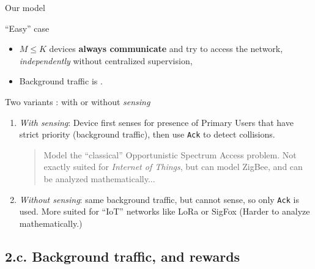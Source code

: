 \documentclass[12pt,english,ignorenonframetext,aspectratio=169,]{beamer}
\providecommand{\tightlist}{%
  \setlength{\itemsep}{0pt}\setlength{\parskip}{0pt}}
\begin{document}
\begin{frame}[fragile]{Our model}

\begin{block}{``Easy'' case}

\begin{itemize}
\tightlist
\item
  \(M \leq K\) devices \textbf{always communicate} and try to access the
  network, \emph{independently} without centralized supervision,
\item
  Background traffic is \iid.
\end{itemize}

\end{block}

\begin{block}{Two variants : with or without \emph{sensing}}

\begin{enumerate}
\def\labelenumi{\arabic{enumi}.}
\tightlist
\item
  \emph{With sensing}: Device first senses for presence of Primary Users that have strict priority
  (background traffic), then use \texttt{Ack} to detect collisions.

  \begin{quote}
  \small{Model the ``classical'' Opportunistic Spectrum Access problem.
  Not exactly suited for \emph{Internet of Things}, but can model ZigBee, and can be analyzed mathematically...}
  \end{quote}

  \pause
\item
  \emph{Without sensing}: same background traffic, but cannot sense, so
  only \texttt{Ack} is used.
  \small{More suited for ``IoT'' networks like LoRa or SigFox} (Harder to
  analyze mathematically.)
\end{enumerate}

\end{block}

\end{frame}



\subsection{\hfill{}2.c. Background traffic, and rewards\hfill{}}
\end{document}
